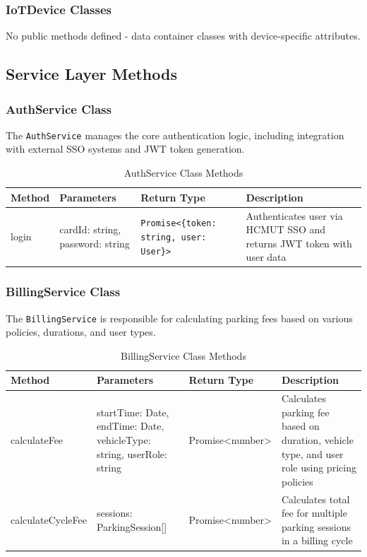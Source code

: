 \subsubsection{IoTDevice Classes}
No public methods defined - data container classes with device-specific attributes.

\subsection{Service Layer Methods}

\subsubsection{AuthService Class}
The \texttt{AuthService} manages the core authentication logic, including integration with external SSO systems and JWT token generation.

\begin{table}[H]
\centering
\footnotesize
\renewcommand{\arraystretch}{1.3}
\begin{tabularx}{\textwidth}{|>{\RaggedRight\arraybackslash}X|>{\RaggedRight\arraybackslash}X|>{\RaggedRight\arraybackslash}X|>{\RaggedRight\arraybackslash}X|}
\hline
\textbf{Method} & \textbf{Parameters} & \textbf{Return Type} & \textbf{Description} \\
\hline
login & cardId: string, password: string & \texttt{Promise<\{token: string, user: User\}>} & Authenticates user via HCMUT SSO and returns JWT token with user data \\
\hline
\end{tabularx}
\caption{AuthService Class Methods}
\label{tab:auth-service-methods}
\end{table}

\subsubsection{BillingService Class}
The \texttt{BillingService} is responsible for calculating parking fees based on various policies, durations, and user types.

\begin{table}[H]
\centering
\footnotesize
\renewcommand{\arraystretch}{1.3}
\begin{tabularx}{\textwidth}{|>{\RaggedRight\arraybackslash}X|>{\RaggedRight\arraybackslash}X|>{\RaggedRight\arraybackslash}X|>{\RaggedRight\arraybackslash}X|}
\hline
\textbf{Method} & \textbf{Parameters} & \textbf{Return Type} & \textbf{Description} \\
\hline
calculateFee & startTime: Date, endTime: Date, vehicleType: string, userRole: string & Promise<number> & Calculates parking fee based on duration, vehicle type, and user role using pricing policies \\
\hline
calculateCycleFee & sessions: ParkingSession[] & Promise<number> & Calculates total fee for multiple parking sessions in a billing cycle \\
\hline
\end{tabularx}
\caption{BillingService Class Methods}
\label{tab:billing-service-methods}
\end{table}

